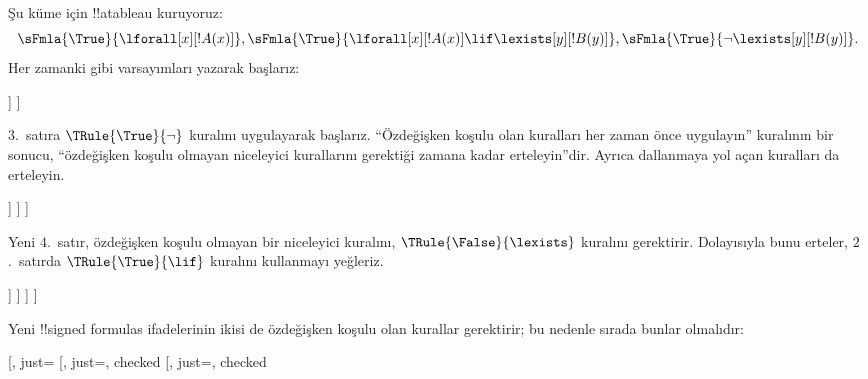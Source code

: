 \begin{ex}
Şu küme için !!a{tableau} kuruyoruz:
\[
\sFmla{\True}{\lforall[x][!A(x)]}, \sFmla{\True}{\lforall[x][!A(x)] 
  \lif \lexists[y][!B(y)]}, \sFmla{\True}{\lnot\lexists[y][!B(y)]}.
\]
Her zamanki gibi varsayımları yazarak başlarız:
\begin{oltableau}
  [\sFmla{\True}{\lforall[x][\formula{A}(x)]}, just=\TAss
    [\sFmla{\True}{\lforall[x][\formula{A}(x)] \lif
        \lexists[y][\formula{B}(y)]}, just=\TAss
      [\sFmla{\True}{\lnot\lexists[y][\formula{B}(y)]}, just=\TAss
      ]
    ]
  ]
\end{oltableau}
$3$.~satıra $\TRule{\True}{\lnot}$ kuralını uygulayarak başlarız.
``Özdeğişken koşulu olan kuralları her zaman önce uygulayın'' kuralının bir
sonucu, ``özdeğişken koşulu olmayan niceleyici kurallarını gerektiği zamana
kadar erteleyin''dir. Ayrıca dallanmaya yol açan kuralları da erteleyin.
\begin{oltableau}
  [\sFmla{\True}{\lforall[x][\formula{A}(x)]}, just=\TAss
    [\sFmla{\True}{\lforall[x][\formula{A}(x)] \lif
        \lexists[y][\formula{B}(y)]}, just=\TAss
      [\sFmla{\True}{\lnot\lexists[y][\formula{B}(y)]}, just=\TAss, checked
        [\sFmla{\False}{\lexists[y][\formula{B}(y)]}, just={\TRule{\True}{\lnot}[3]}]
      ]
    ]
  ]
\end{oltableau}
Yeni $4$.~satır, özdeğişken koşulu olmayan bir niceleyici kuralını,
$\TRule{\False}{\lexists}$ kuralını gerektirir. Dolayısıyla bunu erteler,
$2$.~satırda $\TRule{\True}{\lif}$ kuralını kullanmayı yeğleriz.
\begin{oltableau}
  [\sFmla{\True}{\lforall[x][\formula{A}(x)]}, just=\TAss
    [\sFmla{\True}{\lforall[x][\formula{A}(x)] \lif
        \lexists[y][\formula{B}(y)]}, just=\TAss, checked
      [\sFmla{\True}{\lnot\lexists[y][\formula{B}(y)]}, just=\TAss, checked
        [\sFmla{\False}{\lexists[y][\formula{B}(y)]},
          just={\TRule{\True}{\lnot}[3]},
          [\sFmla{\False}{\lforall[x][\formula{A}(x)]}, just={\TRule{\True}{\lif}[2]}]
          [\sFmla{\True}{\lexists[y][\formula{B}(y)]}, just={\TRule{\True}{\lif}[2]}]
        ]
      ]
    ]
  ]
\end{oltableau}
Yeni !!{signed formula}s ifadelerinin ikisi de özdeğişken koşulu olan
kurallar gerektirir; bu nedenle sırada bunlar olmalıdır:
\begin{oltableau}
  [\sFmla{\True}{\lforall[x][\formula{A}(x)]}, just=\TAss
    [\sFmla{\True}{\lforall[x][\formula{A}(x)] \lif
        \lexists[y][\formula{B}(y)]}, just=\TAss, checked
      [\sFmla{\True}{\lnot\lexists[y][\formula{B}(y)]}, just=\TAss, checked

\end{oltableau}
\end{ex}
